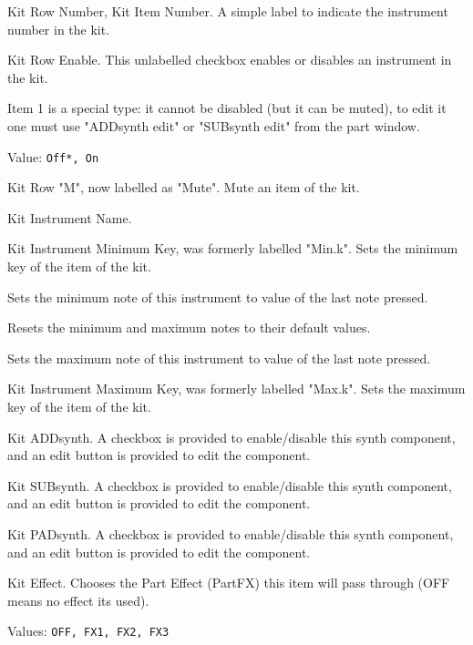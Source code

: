    \setcounter{ItemCounter}{0}      %

   Kit Row Number, Kit Item Number.
   A simple label to indicate the instrument number in the kit.

   Kit Row Enable.  This unlabelled checkbox enables or disables an instrument
   in the kit.

   Item 1 is a special type: it cannot be disabled (but it can be muted), to
   edit it one must use "ADDsynth edit" or "SUBsynth edit" from the part window.

   Value: \texttt{Off*, On}

   Kit Row "M", now labelled as "Mute".
   Mute an item of the kit.

   Kit Instrument Name.

   Kit Instrument Minimum Key, was formerly labelled "Min.k".
   Sets the minimum key of the item of the kit.

   Sets the minimum note of this instrument to value of the last note
   pressed.

   Resets the minimum and maximum notes to their default values.

   Sets the maximum note of this instrument to value of the last note
   pressed.

   Kit Instrument Maximum Key, was formerly labelled "Max.k".
   Sets the maximum key of the item of the kit.

   Kit ADDsynth.
   A checkbox is provided to enable/disable this synth component, and
   an edit button is provided to edit the component.

   Kit SUBsynth.
   A checkbox is provided to enable/disable this synth component, and
   an edit button is provided to edit the component.

   Kit PADsynth.
   A checkbox is provided to enable/disable this synth component, and
   an edit button is provided to edit the component.

   Kit Effect.
   Chooses the Part Effect (PartFX) this item will pass through (OFF means no effect its used).

   Values: \texttt{OFF, FX1, FX2, FX3}

